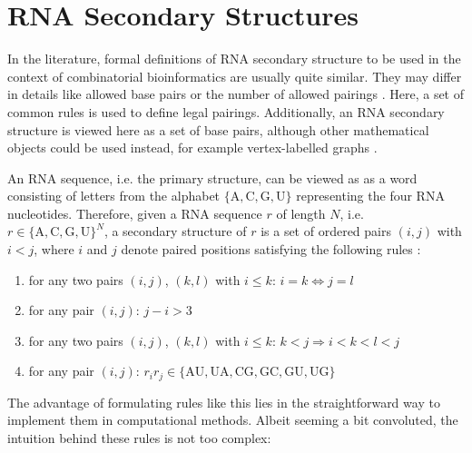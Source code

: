 \documentclass[../../master.tex]{subfiles}
\begin{document}
\section{RNA Secondary Structures}
\label{sec:theory:rna_secstructures}

	




In the literature, formal definitions of RNA secondary structure to be used in the context of combinatorial bioinformatics are usually quite similar.
They may differ in details like allowed base pairs or the number of allowed pairings \parencite{zuker_rna_1984}.
Here, a set of common rules is used to define legal pairings.
Additionally, an RNA secondary structure is viewed here as a set of base pairs, although other mathematical objects could be used instead, for example vertex-labelled graphs \parencite{hofacker_combinatorics_1998}.

An RNA sequence, i.e. the primary structure, can be viewed as as a word consisting of letters from the alphabet $\{\mathrm{A},\mathrm{C},\mathrm{G},\mathrm{U}\}$ representing the four RNA nucleotides.
Therefore, given a RNA sequence $r$ of length $N$, i.e. $r \in \{\mathrm{A},\mathrm{C},\mathrm{G},\mathrm{U}\}^N$, a  secondary structure of $r$ is a set of ordered pairs 
$(i, j)$ with $i < j$, where $i$ and $j$ denote paired positions satisfying the following rules \parencite{hofacker_rna_2005, hofacker_rna_2006}:
\begin{enumerate}[label=(\roman*), leftmargin=*, itemsep=0.4ex, before={\everymath{\displaystyle}}]
	\item for any two pairs $(i, j)$, $(k, l)$ with $i \leq k$: $i=k \Leftrightarrow j=l$ \label{eq:rule1}
	\item for any pair $(i, j)$: $j - i > 3$\label{eq:rule2}
	\item for any two pairs $(i, j)$, $(k, l)$ with $i \leq k$: $k<j \Rightarrow i<k<l<j$ \label{eq:rule3}
	\item for any pair $(i, j)$: $r_i r_j \in \{\mathrm{AU}, \mathrm{UA}, \mathrm{CG}, \mathrm{GC}, \mathrm{GU}, \mathrm{UG}\}$ \label{eq:rule4}
\end{enumerate}
The advantage of formulating rules like this lies in the straightforward way to implement them in computational methods.
Albeit seeming a bit convoluted, the intuition behind these rules is not too complex:
\end{document}

